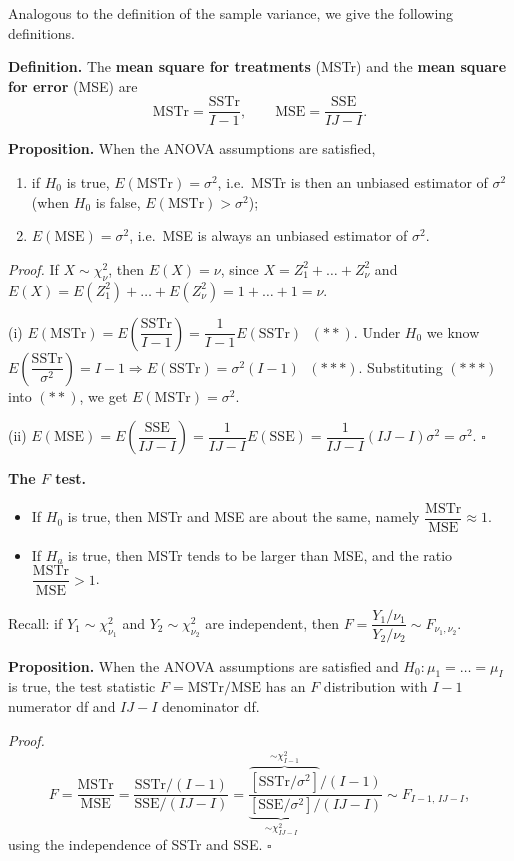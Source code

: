 Analogous to the definition of the sample variance, we give the following definitions.

\textbf{Definition.} The \textbf{mean square for treatments} (MSTr) and the \textbf{mean square for error} (MSE) are
\[
\mathrm{MSTr}=\frac{\mathrm{SSTr}}{I-1},\qquad \mathrm{MSE}=\frac{\mathrm{SSE}}{IJ-I}.
\]

\textbf{Proposition.} When the ANOVA assumptions are satisfied,
\begin{enumerate}
  \item[(i)] if $H_0$ is true, $E(\mathrm{MSTr})=\sigma^2$, i.e.\ MSTr is then an unbiased estimator of $\sigma^2$ (when $H_0$ is false, $E(\mathrm{MSTr})>\sigma^2$);
  \item[(ii)] $E(\mathrm{MSE})=\sigma^2$, i.e.\ MSE is always an unbiased estimator of $\sigma^2$.
\end{enumerate}

\emph{Proof.} If $X\sim\chi^2_\nu$, then $E(X)=\nu$, since $X=Z_1^2+\dots+Z_\nu^2$ and $E(X)=E(Z_1^2)+\dots+E(Z_\nu^2)=1+\dots+1=\nu$.

(i) $E(\mathrm{MSTr}) = E\!\left(\dfrac{\mathrm{SSTr}}{I-1}\right) = \dfrac{1}{I-1}E(\mathrm{SSTr})$ $\;(**)$.
Under $H_0$ we know $E\!\left(\dfrac{\mathrm{SSTr}}{\sigma^2}\right)=I-1 \Rightarrow E(\mathrm{SSTr})=\sigma^2(I-1)$ $\;(***)$.
Substituting $(***)$ into $(**)$, we get $E(\mathrm{MSTr})=\sigma^2$.

(ii) $E(\mathrm{MSE}) = E\!\left(\dfrac{\mathrm{SSE}}{IJ-I}\right) = \dfrac{1}{IJ-I}E(\mathrm{SSE}) = \dfrac{1}{IJ-I}(IJ-I)\sigma^2 = \sigma^2.$ \hfill$\square$

\textbf{The $F$ test.}
\begin{itemize}
  \item If $H_0$ is true, then MSTr and MSE are about the same, namely $\dfrac{\mathrm{MSTr}}{\mathrm{MSE}}\approx1$.
  \item If $H_a$ is true, then MSTr tends to be larger than MSE, and the ratio $\dfrac{\mathrm{MSTr}}{\mathrm{MSE}}>1$.
\end{itemize}
Recall: if $Y_1\sim\chi^2_{\nu_1}$ and $Y_2\sim\chi^2_{\nu_2}$ are independent, then $F=\dfrac{Y_1/\nu_1}{Y_2/\nu_2}\sim F_{\nu_1,\nu_2}$.

\textbf{Proposition.} When the ANOVA assumptions are satisfied and $H_0:\mu_1=\dots=\mu_I$ is true, the test statistic
$F=\mathrm{MSTr}/\mathrm{MSE}$ has an $F$ distribution with $I-1$ numerator df and $IJ-I$ denominator df.

\emph{Proof.}
\[
F=\frac{\mathrm{MSTr}}{\mathrm{MSE}}=\frac{\mathrm{SSTr}/(I-1)}{\mathrm{SSE}/(IJ-I)}
=\frac{\overbrace{[\mathrm{SSTr}/\sigma^2]}^{\sim\chi^2_{I-1}}/(I-1)}{\underbrace{[\mathrm{SSE}/\sigma^2]}_{\sim\chi^2_{IJ-I}}/(IJ-I)}\sim F_{I-1,\,IJ-I},
\]
using the independence of SSTr and SSE. \hfill$\square$

